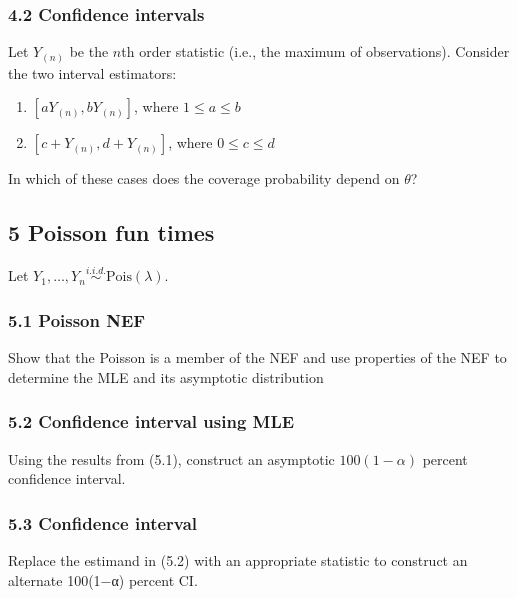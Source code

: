 \documentclass[
]{article}
\providecommand{\tightlist}{%
  \setlength{\itemsep}{0pt}\setlength{\parskip}{0pt}}
\begin{document}
\hypertarget{confidence-intervals}{%
\subsubsection{4.2 Confidence intervals}\label{confidence-intervals}}

Let \(Y_{(n)}\) be the \(n\)th order statistic (i.e., the maximum of
observations). Consider the two interval estimators:

\begin{enumerate}
\def\labelenumi{\arabic{enumi}.}
\tightlist
\item
  \([a Y_{(n)}, b Y_{(n)}]\), where \(1 \leq a \leq b\)
\item
  \([c + Y_{(n)}, d + Y_{(n)}]\), where \(0 \leq c \leq d\)
\end{enumerate}

In which of these cases does the coverage probability depend on
\(\theta\)?

\hypertarget{poisson-fun-times}{%
\subsection{5 Poisson fun times}\label{poisson-fun-times}}

Let \(Y_1, \dots, Y_n \overset{i.i.d.}{\sim} \textrm{Pois}(\lambda)\).

\hypertarget{poisson-nef}{%
\subsubsection{5.1 Poisson NEF}\label{poisson-nef}}

Show that the Poisson is a member of the NEF and use properties of the
NEF to determine the MLE and its asymptotic distribution

\hypertarget{confidence-interval-using-mle}{%
\subsubsection{5.2 Confidence interval using
MLE}\label{confidence-interval-using-mle}}

Using the results from (5.1), construct an asymptotic
\(100(1 - \alpha)\) percent confidence interval.

\hypertarget{confidence-interval}{%
\subsubsection{5.3 Confidence interval}\label{confidence-interval}}

Replace the estimand in (5.2) with an appropriate statistic to construct
an alternate 100(1−α) percent CI.
\end{document}
